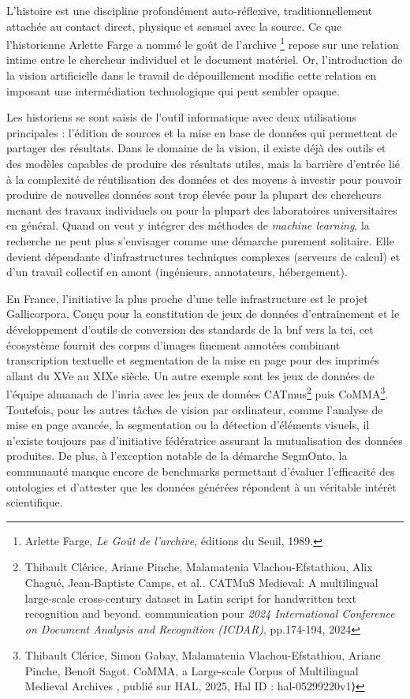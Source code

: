L'histoire est une discipline profondément auto-réflexive, traditionnellement attachée au contact direct, physique et sensuel avec la source. Ce que l'historienne Arlette Farge a nommé le \og goût de l'archive \fg\footnote{Arlette Farge, \textit{Le Goût de l'archive}, éditions du Seuil, 1989.} repose sur une relation intime entre le chercheur individuel et le document matériel. Or, l'introduction de la vision artificielle dans le travail de dépouillement modifie cette relation en imposant une intermédiation technologique qui peut sembler opaque. 

Les historiens se sont saisis de l'outil informatique avec deux utilisations principales : l'édition de sources et la mise en base de données qui permettent de partager des résultats. Dans le domaine de la vision, il existe déjà des outils et des modèles capables de produire des résultats utiles, mais la barrière d'entrée lié à la complexité de réutilisation des données et des moyens à investir pour pouvoir produire de nouvelles données sont trop élevée pour la plupart des chercheurs menant des travaux individuels ou pour la plupart des laboratoires universitaires en général. Quand on veut y intégrer des méthodes de \textit{machine learning}, la recherche ne peut plus s'envisager comme une démarche purement solitaire. Elle devient dépendante d'infrastructures techniques complexes (serveurs de calcul) et d'un travail collectif en amont (ingénieurs, annotateurs, hébergement).

En France, l'initiative la plus proche d'une telle infrastructure est le projet Gallicorpora. Conçu pour la constitution de jeux de données d'entraînement et le développement d'outils de conversion des standards de la \gls{bnf} vers la \gls{tei}, cet écosystème fournit des corpus d'images finement annotées combinant transcription textuelle et segmentation de la mise en page pour des imprimés allant du XVe au XIXe siècle. Un autre exemple sont les jeux de données de l'équipe \gls{almanach} de l'\gls{inria} avec les jeux de données CATmus\footnote{Thibault Clérice, Ariane Pinche, Malamatenia Vlachou-Efstathiou, Alix Chagué, Jean-Baptiste Camps, et al.. \og CATMuS Medieval: A multilingual large-scale cross-century dataset in Latin script for handwritten text recognition and beyond. \fg communication pour \textit{2024 International Conference on Document Analysis and Recognition (ICDAR)}, pp.174-194, 2024} puis CoMMA\footnote{Thibault Clérice, Simon Gabay, Malamatenia Vlachou-Efstathiou, Ariane Pinche, Benoît Sagot. \og CoMMA, a Large-scale Corpus of Multilingual Medieval Archives \fg, publié sur HAL, 2025,  Hal ID : hal-05299220v1⟩}. Toutefois, pour les autres tâches de vision par ordinateur, comme l'analyse de mise en page avancée, la segmentation ou la détection d'éléments visuels, il n'existe toujours pas d'initiative fédératrice assurant la mutualisation des données produites. De plus, à l'exception notable de la démarche SegmOnto, la communauté manque encore de benchmarks permettant d'évaluer l'efficacité des ontologies et d'attester que les données générées répondent à un véritable intérêt scientifique.

